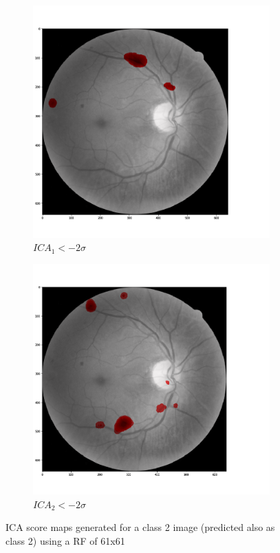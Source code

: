 \begin{figure}[h!]
\begin{subfigure}[b]{0.32\textwidth}
		\includegraphics[width=\textwidth]{Figures/chapter_ica/figures/img_t2_p2/rf61/ica1.png}
		\caption{$ICA_1 < - 2 \sigma$}	
	\end{subfigure}
	\begin{subfigure}[b]{0.32\textwidth}
		\centering
		\includegraphics[width=\textwidth]{Figures/chapter_ica/figures/img_t2_p2/rf61/ica2.png}
		\caption{$ICA_2 < - 2 \sigma$}	
	\end{subfigure}
	\hfill 
	\caption[ICA score maps generated for a class 2 image RF 61x61]{ICA score maps generated for a class 2 image (predicted also as class 2) using a RF of 61x61}  
	\label{fig:ica_components_class2} 
\end{figure}


